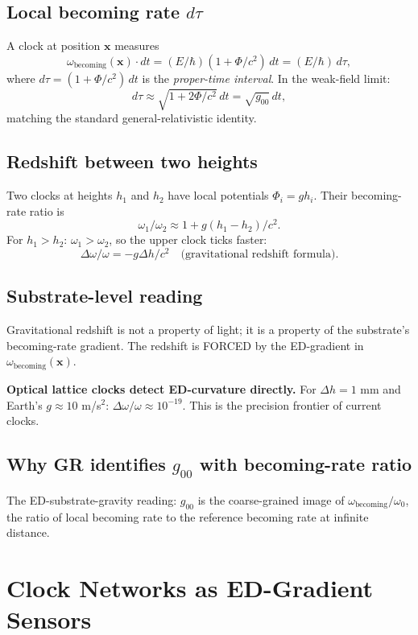 \documentclass[11pt,a4paper]{article}
\begin{document}
\subsection{Local becoming rate $d\tau$}

A clock at position $\mathbf{x}$ measures
\[
\omega_{\mathrm{becoming}}(\mathbf{x})\cdot dt = (E/\hbar)(1 + \Phi/c^2)\, dt = (E/\hbar)\, d\tau,
\]
where $d\tau = (1 + \Phi/c^2)\, dt$ is the \emph{proper-time interval}. In the weak-field limit:
\[
d\tau \approx \sqrt{1 + 2\Phi/c^2}\, dt = \sqrt{g_{00}}\, dt,
\]
matching the standard general-relativistic identity.

\subsection{Redshift between two heights}

Two clocks at heights $h_1$ and $h_2$ have local potentials $\Phi_i = g h_i$. Their becoming-rate ratio is
\[
\omega_1/\omega_2 \approx 1 + g(h_1 - h_2)/c^2.
\]
For $h_1 > h_2$: $\omega_1 > \omega_2$, so the upper clock ticks faster:
\[
\Delta\omega/\omega = -g\Delta h/c^2 \quad \text{(gravitational redshift formula)}.
\]

\subsection{Substrate-level reading}

Gravitational redshift is not a property of light; it is a property of the substrate's becoming-rate gradient. The redshift is FORCED by the ED-gradient in $\omega_{\mathrm{becoming}}(\mathbf{x})$.

\textbf{Optical lattice clocks detect ED-curvature directly.} For $\Delta h = 1$ mm and Earth's $g \approx 10$ m/s$^2$: $\Delta\omega/\omega \approx 10^{-19}$. This is the precision frontier of current clocks.

\subsection{Why GR identifies $g_{00}$ with becoming-rate ratio}

The ED-substrate-gravity reading: $g_{00}$ is the coarse-grained image of $\omega_{\mathrm{becoming}}/\omega_0$, the ratio of local becoming rate to the reference becoming rate at infinite distance.

\section{Clock Networks as ED-Gradient Sensors}
\end{document}
